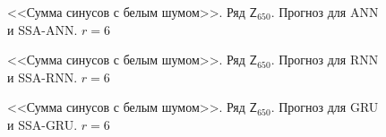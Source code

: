 \documentclass[specialist,
               substylefile = spbu.rtx,
               subf,href,colorlinks=true, 12p]{disser}
\begin{document}
\begin{figure}[H]
	\captionsetup{justification=centering}
	\caption{<<Сумма синусов с белым шумом>>. Ряд $\mathsf{Z}_{650}$. Прогноз для ANN и SSA-ANN. $r = 6$}
\end{figure}

\begin{figure}[H]
	\captionsetup{justification=centering}
	\caption{<<Сумма синусов с белым шумом>>. Ряд $\mathsf{Z}_{650}$. Прогноз для RNN и SSA-RNN. $r = 6$}
	\label{edsinr_r6_res_rnn}
\end{figure}

\begin{figure}[H]
	\captionsetup{justification=centering}
	\caption{<<Сумма синусов с белым шумом>>. Ряд $\mathsf{Z}_{650}$. Прогноз для GRU и SSA-GRU. $r = 6$}
	\label{edsinr_r6_res_gru}
\end{figure}
\end{document}

